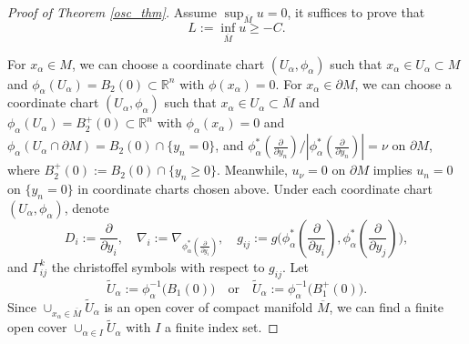 \documentclass[12pt]{amsart}
\theoremstyle{definition}
\theoremstyle{remark}
\numberwithin{equation}{section}
\begin{document}
\begin{proof}[Proof of Theorem \ref{osc_thm}]
	
	Assume $\sup_{\overline{M}} u =0$, it suffices to prove that 
	\begin{equation}
	L := \inf_{\overline{M}} u \geq - C.
	\end{equation}
	
	
	For $x_\alpha \in M$, we can choose a coordinate chart $(U_\alpha, \phi_\alpha)$ such that $x_\alpha \in U_\alpha \subset M$ and $\phi_\alpha (U_\alpha) = B_2(0) \subset \mathbb{R}^n$ with $\phi (x_\alpha) = 0$. For $x_\alpha \in \partial M$, we can choose a coordinate chart $(U_\alpha, \phi_\alpha)$ such that $x_\alpha \in U_\alpha \subset \overline{M}$ and $\phi_\alpha (U_\alpha) = B_2^+ (0)\subset \mathbb{R}^n$ with $\phi_\alpha (x_\alpha) = 0$ and $\phi_\alpha (U_\alpha \cap \partial M) = B_{2}(0) \cap \{y_n = 0\}$, and $\phi_\alpha^* (\frac{\partial}{\partial y_n}) / |\phi_\alpha^* (\frac{\partial}{\partial y_n})| = \nu$ on $\partial M$, where $B_{2}^{+}(0) := B_{2}(0) \cap \{y_n \geq 0\}$. Meanwhile, $u_\nu = 0$ on $\partial M$ implies $u_n = 0$ on $\{y_n = 0\}$ in coordinate charts chosen above. 
	Under each coordinate chart $(U_\alpha, \phi_\alpha)$, denote $$D_i := \frac{\partial}{\partial y_i},\quad \nabla_i := \nabla_{\phi^*_{\alpha}(\frac{\partial}{\partial y_i})},\quad g_{ij} := g\Big(\phi^*_{\alpha}(\frac{\partial}{\partial y_i}), \phi^*_{\alpha}(\frac{\partial}{\partial y_j})\Big),$$ and $\Gamma_{ij}^k$ the christoffel symbols with respect to $g_{ij}$.
	Let $$\tilde{U}_\alpha := \phi_\alpha^{-1} \big(B_1(0)\big) \quad \text{or} \quad \tilde{U}_\alpha := \phi_\alpha^{-1} \big(B_1^+(0)\big).$$ Since $\cup_{x_\alpha \in \overline{M}} \tilde{U}_\alpha$ is an open cover of compact manifold $\overline{M}$, we can find a finite open cover $\cup_{\alpha \in I} \tilde{U}_\alpha$ with $I$ a finite index set.
	

\end{proof}
\end{document}
